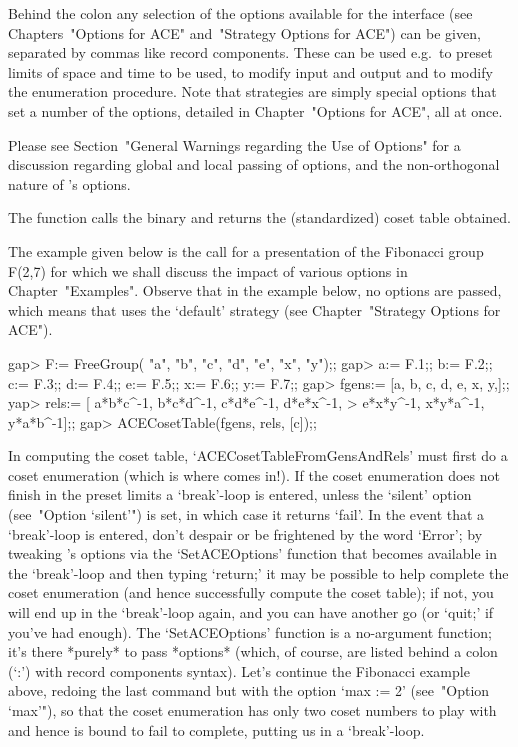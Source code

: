 Behind the colon any  selection  of  the  options  available  for  the
interface (see Chapters~"Options for ACE"  and~"Strategy  Options  for
ACE") can be given, separated by commas like record components.  These
can be used e.g.~to preset limits of space and time  to  be  used,  to
modify input and output and to modify the enumeration procedure.  Note
that strategies are simply special options that set a  number  of  the
options, detailed in Chapter~"Options for ACE", all at once.

Please see Section~"General Warnings regarding the Use of Options" for
a discussion regarding global and local passing of  options,  and  the
non-orthogonal nature of {\ACE}'s options.

The function calls the {\ACE} binary and  returns  the  (standardized)
coset table obtained.

The example given  below  is  the  call  for  a  presentation  of  the
Fibonacci group F(2,7) for  which  we  shall  discuss  the  impact  of
various options in Chapter~"Examples". Observe  that  in  the  example
below, no options  are  passed,  which  means  that  {\ACE}  uses  the
`default' strategy (see Chapter~"Strategy Options for ACE").

\beginexample
gap> F:= FreeGroup( "a", "b", "c", "d", "e", "x", "y");;
gap> a:= F.1;; b:= F.2;; c:= F.3;; d:= F.4;; e:= F.5;; x:= F.6;; y:= F.7;;
gap> fgens:= [a, b, c, d, e, x, y,];;
yap> rels:= [ a*b*c^-1, b*c*d^-1, c*d*e^-1, d*e*x^-1, 
>             e*x*y^-1, x*y*a^-1, y*a*b^-1];;
gap> ACECosetTable(fgens, rels, [c]);;
\endexample

In computing  the  coset  table,  `ACECosetTableFromGensAndRels'  must
first do a coset enumeration (which is where {\ACE} comes in!). If the
coset  enumeration  does  not  finish   in   the   preset   limits   a
`break'-loop{\undoquotes{}}        is
entered, unless the `silent' option (see~"Option `silent'") is set, in
which case it returns `fail'. In the  event  that  a  `break'-loop  is
entered, don't despair or  be  frightened  by  the  word  `Error';  by
tweaking  {\ACE}'s  options  via  the  `SetACEOptions'  function  that
becomes available in the `break'-loop and then typing `return;' it may
be possible to help {\ACE} complete the coset enumeration  (and  hence
successfully compute the coset table); if not, you will end up in  the
`break'-loop again, and you can have another go (or `quit;' if  you've
had enough). The `SetACEOptions' function is a  no-argument  function;
it's there *purely* to pass *options* (which, of  course,  are  listed
behind a colon (`:') with record components  syntax).  Let's  continue
the Fibonacci example above, redoing the last  command  but  with  the
option `max := 2' (see~"Option `max'"), so that the coset  enumeration
has only two coset numbers to play with and hence is bound to fail  to
complete, putting us in a `break'-loop.

